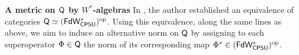 \begin{comment}
\end{remark}

\begin{definition} \label{def:tensor} [\emph{Tensor Product }]
  For signatures $\sigma = n_1, \ldots, n_s $ and $\tau= m_1, \ldots, m_t $, the tensor product of $\sigma$ and $\tau$ is defined as $\sigma \otimes \tau = n_1 m_1, \ldots ,n_1 m_t, \ldots, n_s m_1,...,n_s m_t$. 
  The morphism part of the tensor product follows the definition in the category of vector spaces. If $\Phi: \sigma \rightarrow \tau$ and $\Psi: \sigma' \rightarrow  \tau'$, then their tensor product $\Psi \otimes \Phi: \sigma \otimes \sigma' \rightarrow  \tau \otimes \tau' $ is 
the Kronecker product of their matrices representation, \ie,
\begin{align*}
  \Phi \otimes \Psi = 
  \begin{pmatrix}
  \Phi_{11} \otimes \Psi_{11} & \ldots & \Phi_{11} \otimes \Psi_{s'1} & \ldots   & \Phi_{s1} \otimes \Psi_{11} & \ldots & \Phi_{s1} \otimes \Psi_{s'1} \\
  \vdots & & & & & & \vdots \\
  \Phi_{1t} \otimes \Psi_{1t'} & \ldots & \Phi_{1t} \otimes \Psi_{s't'} & \ldots   & \Phi_{st} \otimes \Psi_{1t'} & \ldots & \Phi_{st} \otimes \Psi_{s't'}
\end{pmatrix}
\end{align*}



 Moreover, $\dist$ is an identity map:
  \[ (\sigma \oplus \sigma') \otimes \tau = (\sigma \otimes \tau ) \oplus (\sigma' \otimes \tau ) \]

  
\end{definition}


The category $\catQ$ is a distributive symmetric monoidal category with binary coproducts. However, this category is not closed \cite{selinger2004b}.

\end{comment}

\textbf{A metric on $\mathsf{Q}$ by $W^*$-algebras}
In \cite{choSemanticsQuantumProgramming2016}, the author established an equivalence of categories  
$\mathsf{Q} \simeq (\mathsf{FdW^*_{CPSU}})^{\mathrm{op}}$.  
Using this equivalence, along the same lines as above, we aim to induce an alternative norm on $\mathsf{Q}$ by assigning to each superoperator $\Phi \in \mathsf{Q}$ the norm of its corresponding map $\Phi^* \in (\mathsf{FdW^*_{CPSU}})^{\mathrm{op}}$. %

